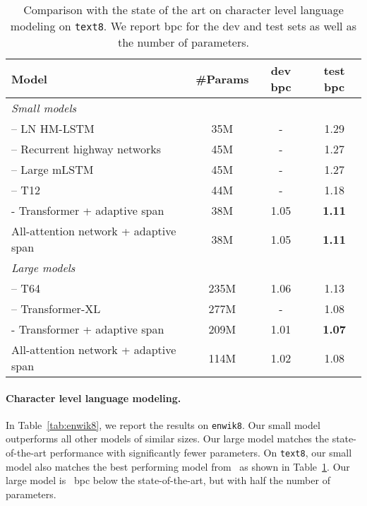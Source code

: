 \documentclass{article}
\newcommand{\tab}[1]{Table~\ref{tab:#1}}
\begin{document}
\begin{table}[t]
\centering
\caption{
  Comparison with the state of the art on character level language modeling on \texttt{text8}.
  We report bpc for the dev and test sets as well as the number of parameters.
}
\label{tab:text8}
\begin{tabular}{lccc}
  \toprule
  Model & \#Params & dev bpc & test bpc \\
  \midrule
  \multicolumn{4}{l}{\emph{Small models}}\\
\citet{chung2016hierarchical} – LN HM-LSTM& 35M & - & 1.29\\
\citet{zilly2017recurrent} – Recurrent highway networks & 45M & - & 1.27\\
\citet{krause2016multiplicative} – Large mLSTM& 45M & - & 1.27\\
\citet{al2018character} – T12 & 44M  & - & 1.18\\
  \citet{sukhbaatar2019adaptive} - Transformer + adaptive span & 38M  & 1.05 & \bf 1.11 \\
  All-attention network + adaptive span                       & 38M & 1.05 & \bf 1.11 \\
  \midrule
  \multicolumn{4}{l}{\emph{Large models}}\\
  \citet{al2018character} – T64 & 235M  & 1.06 & 1.13\\
  \citet{dai2019transformer} – Transformer-XL & 277M & - & 1.08\\
  \citet{sukhbaatar2019adaptive} - Transformer  + adaptive span   & 209M  & 1.01 & \bf 1.07 \\
  All-attention network + adaptive span                       & 114M & 1.02 & 1.08 \\
  \bottomrule
\end{tabular}
\end{table}

\paragraph{Character level language modeling.}
In \tab{enwik8}, we report the results on \texttt{enwik8}.
Our small model outperforms all other models of similar sizes.
Our large model matches the state-of-the-art performance with significantly fewer parameters.
On \texttt{text8}, our small model also matches the best performing model from~\citet{sukhbaatar2019adaptive} as shown in \tab{text8}.
Our large model is ~bpc below the state-of-the-art, but with half the number of parameters.
\end{document}
